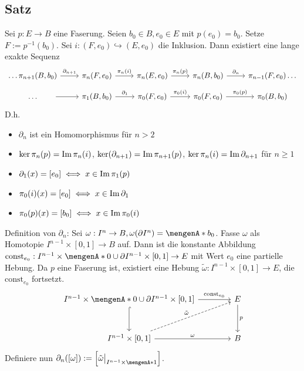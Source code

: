 \subsection[Satz: Existenz einer langen exakten Sequenz von Homotopiegruppen für Faserung]{Satz} %
\label{sub:1411}
Sei $p : E \to B$ eine Faserung. Seien $b_0 \in B, e_0 \in E$ mit $p(e_0)= b_0$. Setze $F := p ^{-1}(b_0)$. Sei $i : (F, e_0) \hookrightarrow (E,e_0)$ die Inklusion.
Dann existiert eine lange exakte Sequenz
\[
	\begin{tikzcd}[row sep=1em]
		\ldots  \pi_{n+1}(B,b_0) \rar["\partial_{n+1}"] & \pi_n(F,e_0) \rar["\pi_n(i)"] & \pi_n(E,e_0) \rar["\pi_n(p)"]& \pi_n(B,b_0)  \rar["\partial_n"]& \pi_{n-1}(F,e_0) \ldots  \\
		\qquad \ldots  \qquad  \rar & \pi_1(B,b_0) \rar["\partial_1"] & \pi_0(F,e_0) \rar["\pi_0(i)"]& \pi_0(F,e_0) \rar["\pi_0(p)"]& \pi_0(B,b_0)
	\end{tikzcd}
\]
D.h.
\begin{itemize}
	\item $\partial_n$ ist ein Homomorphismus für $n >2$
	\item $\ker \pi_n(p) = \operatorname{Im} \pi_n(i)$, $\ker( \partial_{n+1}) = \operatorname{Im} \pi_{n+1}(p)$, $\ker \pi_n(i) = \operatorname{Im} \partial_{n+1}$ für $n \ge 1$
	\item $\partial_1(x) = [e_0] \iff x \in \operatorname{Im} \pi_1(p)$
	\item $\pi_0(i)(x) = [e_0] \iff x \in \operatorname{Im} \partial_1$
	\item $\pi_0(p)(x) = [b_0] \iff x \in \operatorname{Im} \pi_0 (i)$
\end{itemize}
Definition von $\partial_n$: Sei $\omega : I^n \to B, \omega(\partial I^n) = \set{b_0} $. Fasse $\omega$ als Homotopie $I^{n-1} \times [0,1] \to B$ auf.
Dann ist die konstante Abbildung $\mathrm{const}_{e_0} : I^{n-1} \times \set{0} \cup \partial I^{n-1} \times [0,1] \to E$ mit Wert $e_0$ eine partielle Hebung.
Da $p$ eine Faserung ist, existiert eine Hebung $\tilde{\omega} : I^{n-1} \times [0,1] \to E$, die $\mathrm{const}_{e_0}$ fortsetzt.
\[
	\begin{tikzcd}[row sep=3em, column sep=4em]
		I^{n-1} \times \set{0} \cup \partial I^{n-1} \times [0,1] \rar["\mathrm{const}_{e_0}"] \dar[hook]& E \dar["p"] \\
		I^{n-1} \times [0,1] \rar["\omega"] \urar[dashed, "\tilde{\omega}"]& B 
	\end{tikzcd}
\]
Definiere nun $\partial_n([\omega]) := \benbrace*{\tilde{\omega}\big|_{I^{n-1} \times \set{1}}} $. 
